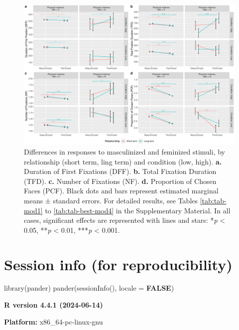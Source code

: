 \documentclass[
  bookmarksnumbered]{article}
\newenvironment{Shaded}{\begin{snugshade}}{\end{snugshade}}
\newcommand{\AttributeTok}[1]{\textcolor[rgb]{0.80,0.80,0.80}{#1}}
\newcommand{\ConstantTok}[1]{\textcolor[rgb]{0.86,0.64,0.64}{\textbf{#1}}}
\newcommand{\FunctionTok}[1]{\textcolor[rgb]{0.94,0.94,0.56}{#1}}
\newcommand{\NormalTok}[1]{\textcolor[rgb]{0.80,0.80,0.80}{#1}}
\begin{document}
\begin{figure}
\centering
\includegraphics{Supplementary_material_files/figure-latex/unnamed-chunk-52-1.pdf}
\caption{\label{fig:unnamed-chunk-52}Differences in responses to masculinized and feminized stimuli, by relationship (short term, ling term) and condition (low, high). \textbf{a.} Duration of First Fixations (DFF). \textbf{b.} Total Fixation Duration (TFD). \textbf{c.} Number of Fixations (NF). \textbf{d.} Proportion of Chosen Faces (PCF). Black dots and bars represent estimated marginal means ± standard errors. For detailed results, see Tables \ref{tab:tab-mod1} to \ref{tab:tab-best-mod4} in the Supplementary Material. In all cases, significant effects are represented with lines and stars: *\emph{p} \textless{} 0.05, **\emph{p} \textless{} 0.01, ***\emph{p} \textless{} 0.001.}
\end{figure}

\section{Session info (for reproducibility)}\label{session}

\begin{Shaded}
\begin{Highlighting}[]
\FunctionTok{library}\NormalTok{(pander)}
\FunctionTok{pander}\NormalTok{(}\FunctionTok{sessionInfo}\NormalTok{(), }\AttributeTok{locale =} \ConstantTok{FALSE}\NormalTok{)}
\end{Highlighting}
\end{Shaded}

\textbf{R version 4.4.1 (2024-06-14)}

\textbf{Platform:} x86\_64-pc-linux-gnu
\end{document}
